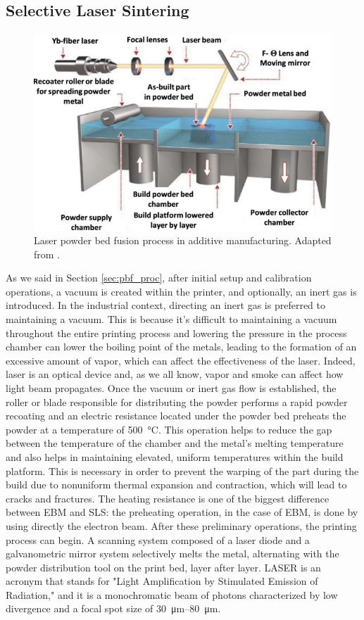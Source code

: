 \subsection{Selective Laser Sintering}
\label{subsec:LPBF}
\begin{figure}[H]
    \centering
    \includegraphics[scale=1.3]{Images/PBF.jpg}
    \caption[Laser PBF in AM.]{Laser powder bed fusion process in additive manufacturing. Adapted from \cite{ozel_focus_2020}.}
    \label{fig:PBF}
\end{figure}
As we said in Section \ref{sec:pbf_proc}, after initial setup and calibration operations, a vacuum is created within the printer, and optionally, an inert gas is introduced. In the industrial context, directing an inert gas is preferred to maintaining a vacuum. This is because it's difficult to maintaining a vacuum throughout the entire printing process and lowering the pressure in the process chamber can lower the boiling point of the metals, leading to the formation of an excessive amount of vapor, which can affect the effectiveness of the laser. Indeed, laser is an optical device and, as we all know, vapor and smoke can affect how light beam propagates. Once the vacuum or inert gas flow is established, the roller or blade responsible for distributing the powder performs a rapid powder recoating and an electric resistance located under the powder bed preheats the powder at a temperature of \SI{500}{\degreeCelsius}. This operation helps to reduce the gap between the temperature of the chamber and the metal's melting temperature and also helps in maintaining elevated, uniform temperatures within the build platform. This is necessary in order to prevent the warping of the part during the build due to nonuniform thermal expansion and contraction, which will lead to cracks and fractures. The heating resistance is one of the biggest difference between EBM and SLS: the preheating operation, in the case of EBM, is done by using directly the electron beam. After these preliminary operations, the printing process can begin. A scanning system composed of a laser diode and a galvanometric mirror system selectively melts the metal, alternating with the powder distribution tool on the print bed, layer after layer. LASER is an acronym that stands for "Light Amplification by Stimulated Emission of Radiation," and it is a monochromatic beam of photons characterized by low divergence and a focal spot size of \SIrange[range-phrase = --]{30}{80}{\micro\metre}.
